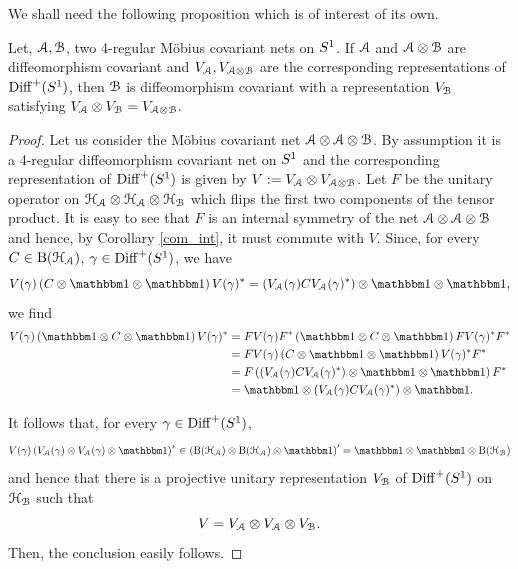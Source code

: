 \documentclass[12pt]{article}
\begin{document}
We shall need the following proposition which is of interest of its 
own.

\begin{proposition} 
\label{difftensor}
Let, ${\mathcal A}, {\mathcal B}$, two 4-regular M\"obius 
covariant nets on $\s1$. 
If ${\mathcal A}$ and ${\mathcal A} \otimes {\mathcal B}$ are diffeomorphism covariant and 
$V_{\mathcal A}, V_{{\mathcal A}\otimes {\mathcal B}}$ are the corresponding representations of
${{\rm Diff}^+(S^1)}$, then ${\mathcal B}$ is diffeomorphism covariant with a representation 
$V_{\mathcal B}$ satisfying $V_{\mathcal A} \otimes V_{\mathcal B} =  V_{{\mathcal A}\otimes {\mathcal B}}.$
\end{proposition}
\begin{proof}
Let us consider the M\"obius covariant net ${\mathcal A}\otimes{\mathcal A} \otimes{\mathcal B}$. 
By assumption it is a 4-regular diffeomorphism covariant net on $\s1$
and the corresponding representation of ${{\rm Diff}^+(S^1)}$ is given by 
$V:=V_{\mathcal A} \otimes  V_{{\mathcal A}\otimes {\mathcal B}}$. Let $F$ be the unitary operator 
on ${\mathcal H}_{\mathcal A}\otimes {\mathcal H}_{\mathcal A} \otimes {\mathcal H}_{\mathcal B}$ which flips the first two components 
of the tensor product. It is easy to see that $F$ is an internal symmetry 
of the net ${\mathcal A}\otimes{\mathcal A} \otimes{\mathcal B}$ and hence,
by Corollary \ref{com_int}, it must commute with $V$. Since, 
for every $C \in {\rm B}({\mathcal H}_{\mathcal A})$, $\gamma \in {{\rm Diff}^+(S^1)}$,  we have 
$$V(\gamma)\left(C\otimes {\mathbbm 1} \otimes {\mathbbm 1}
\right)V(\gamma)^* 
=\left(V_\A(\gamma)CV_\A(\gamma)^*\right)\otimes {\mathbbm 1} 
\otimes {\mathbbm 1},$$ we find 
\begin{align*}
V(\gamma)\left({\mathbbm 1}\otimes C \otimes {\mathbbm 1}
\right)V(\gamma)^* &=
FV(\gamma)F^*\left({\mathbbm 1}
\otimes C \otimes {\mathbbm 1}
\right)FV(\gamma)^*F^* \\
&= FV(\gamma)\left(C\otimes {\mathbbm 1}
\otimes {\mathbbm 1}
\right)V(\gamma)^*F^* \\
&= F \left( \left(V_\A(\gamma)CV_\A(\gamma)^*\right)\otimes 
{\mathbbm 1} \otimes {\mathbbm 1}
\right)F^* \\
&= {\mathbbm 1} \otimes\left(V_\A(\gamma)CV_\A(\gamma)^*\right)
\otimes {\mathbbm 1}.
\end{align*}

It follows that, for every $\gamma \in {{\rm Diff}^+(S^1)}$, 
$$V(\gamma)\left(V_\A(\gamma)\otimes V_\A(\gamma) 
\otimes {\mathbbm 1} \right)^*
\in \left({\rm B}(\H_\A) \otimes {\rm B}(\H_\A)  
\otimes {\mathbbm 1} \right)'= 
{\mathbbm 1} \otimes {\mathbbm 1}
\otimes {\rm B}(\H_\B)$$
and hence that there is a projective unitary representation $V_{\mathcal B}$ of 
${{\rm Diff}^+(S^1)}$ on ${\mathcal H}_{\mathcal B}$ such that 
$$V=V_{\mathcal A} \otimes V_{\mathcal A} \otimes V_{\mathcal B}.$$
Then, the conclusion easily follows. 
 
\end{proof}
\end{document}
